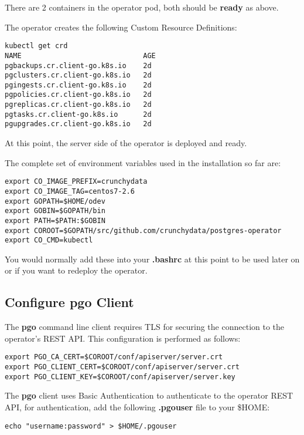 \documentclass[letterpaper,12pt]{article}
\begin{document}
There are 2 containers in the operator pod, both should be \textbf{ready} as above.

The operator creates the following Custom Resource Definitions:
\vspace{.75em}
\begin{lstlisting}
kubectl get crd
NAME                             AGE
pgbackups.cr.client-go.k8s.io    2d
pgclusters.cr.client-go.k8s.io   2d
pgingests.cr.client-go.k8s.io    2d
pgpolicies.cr.client-go.k8s.io   2d
pgreplicas.cr.client-go.k8s.io   2d
pgtasks.cr.client-go.k8s.io      2d
pgupgrades.cr.client-go.k8s.io   2d
\end{lstlisting}

At this point, the server side of the operator is deployed and ready.

The complete set of environment variables used in the installation so far are:
\vspace{.75em}
\begin{lstlisting}
export CO_IMAGE_PREFIX=crunchydata
export CO_IMAGE_TAG=centos7-2.6
export GOPATH=$HOME/odev
export GOBIN=$GOPATH/bin
export PATH=$PATH:$GOBIN
export COROOT=$GOPATH/src/github.com/crunchydata/postgres-operator
export CO_CMD=kubectl
\end{lstlisting}

You would normally add these into your \textbf{.bashrc} at this point to be used later on or if you want to redeploy the operator.

\subsection{Configure \textbf{pgo} Client}\label{/_basic_installation/_configure_b_pgo_b_client}

The \textbf{pgo} command line client requires TLS for securing the connection to the operator's REST API. This configuration is performed as follows:
\vspace{.75em}
\begin{lstlisting}
export PGO_CA_CERT=$COROOT/conf/apiserver/server.crt
export PGO_CLIENT_CERT=$COROOT/conf/apiserver/server.crt
export PGO_CLIENT_KEY=$COROOT/conf/apiserver/server.key
\end{lstlisting}

The \textbf{pgo} client uses Basic Authentication to authenticate to the operator REST API, for authentication, add the following \textbf{.pgouser} file to your \$HOME:
\vspace{.75em}
\begin{lstlisting}
echo "username:password" > $HOME/.pgouser
\end{lstlisting}
\end{document}

